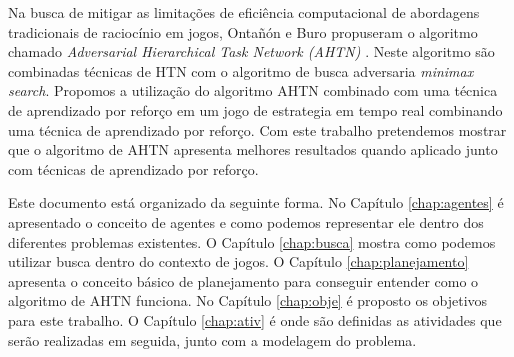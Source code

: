 Na busca de mitigar as limitações de eficiência computacional de abordagens tradicionais de raciocínio em jogos, Ontañón e Buro propuseram o algoritmo chamado \textit{Adversarial Hierarchical Task Network (AHTN)} \cite{ontanon2015adversarial}. Neste algoritmo são combinadas técnicas de HTN com o algoritmo de busca adversaria \textit{minimax search}. 
% 
Propomos a utilização do algoritmo AHTN combinado com uma técnica de aprendizado por reforço em um jogo de estrategia em tempo real combinando uma técnica de aprendizado por reforço. Com este trabalho pretendemos mostrar que o algoritmo de AHTN apresenta melhores resultados quando aplicado junto com técnicas de aprendizado por reforço.

Este documento está organizado da seguinte forma. No Capítulo \ref{chap:agentes} é apresentado o conceito de agentes e como podemos representar ele dentro dos diferentes problemas existentes. O Capítulo \ref{chap:busca} mostra como podemos utilizar busca dentro do contexto de jogos. O Capítulo \ref{chap:planejamento} apresenta o conceito básico de planejamento para conseguir entender como o algoritmo de AHTN funciona. No Capítulo \ref{chap:obje} é proposto os objetivos para este trabalho. O Capítulo \ref{chap:ativ} é onde são definidas as atividades que serão realizadas em seguida, junto com a modelagem do problema.   
